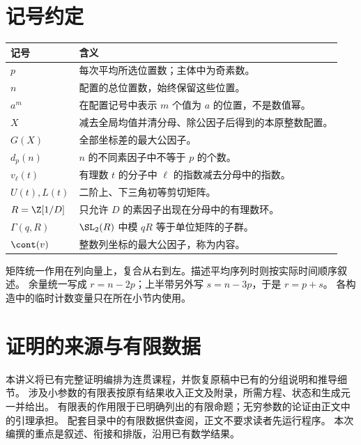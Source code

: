 \section*{记号约定}
\begin{longtable}{p{}p{}}
\toprule 记号 & 含义\\\midrule
$p$ & 每次平均所选位置数；主体中为奇素数。\\
$n$ & 配置的总位置数，始终保留这些位置。\\
$a^m$ & 在配置记号中表示 $m$ 个值为 $a$ 的位置，不是数值幂。\\
$X$ & 减去全局均值并清分母、除公因子后得到的本原整数配置。\\
$G(X)$ & 全部坐标差的最大公因子。\\
$d_p(n)$ & $n$ 的不同素因子中不等于 $p$ 的个数。\\
$v_\ell(t)$ & 有理数 $t$ 的分子中 $\ell$ 的指数减去分母中的指数。\\
$U(t),L(t)$ & 二阶上、下三角初等剪切矩阵。\\
$R=\Z[1/D]$ & 只允许 $D$ 的素因子出现在分母中的有理数环。\\
$\Gamma(q,R)$ & $\SL_2(R)$ 中模 $qR$ 等于单位矩阵的子群。\\
$\cont(v)$ & 整数列坐标的最大公因子，称为内容。\\
\bottomrule
\end{longtable}
矩阵统一作用在列向量上，复合从右到左。描述平均序列时则按实际时间顺序叙述。
余量统一写成 $r=n-2p$；上半带另外写 $s=n-3p$，于是 $r=p+s$。
各构造中的临时计数变量只在所在小节内使用。

\section*{证明的来源与有限数据}
本讲义将已有完整证明编排为连贯课程，并恢复原稿中已有的分组说明和推导细节。
涉及小参数的有限表按原有结果收入正文及附录，所需方程、状态和生成元一并给出。
有限表的作用限于已明确列出的有限命题；无穷参数的论证由正文中的引理承担。
配套目录中的有限数据供查阅，正文不要求读者先运行程序。
本次编撰的重点是叙述、衔接和排版，沿用已有数学结果。
